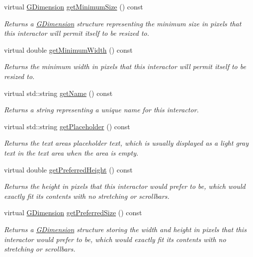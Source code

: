 \begin{DoxyCompactItemize}
virtual \mbox{\hyperlink{classGDimension}{G\+Dimension}} \mbox{\hyperlink{classGInteractor_a66b5af0b32493b4d597ca0a3df2049ea}{get\+Minimum\+Size}} () const
\begin{DoxyCompactList}\small\item\em Returns a \mbox{\hyperlink{classGDimension}{G\+Dimension}} structure representing the minimum size in pixels that this interactor will permit itself to be resized to. \end{DoxyCompactList}\item 
virtual double \mbox{\hyperlink{classGInteractor_a59e668114fe3d49d2a0f28deb258f7c8}{get\+Minimum\+Width}} () const
\begin{DoxyCompactList}\small\item\em Returns the minimum width in pixels that this interactor will permit itself to be resized to. \end{DoxyCompactList}\item 
virtual std\+::string \mbox{\hyperlink{classGInteractor_a8a60438a5b55d0b2ceb35c8674b9d8c5}{get\+Name}} () const
\begin{DoxyCompactList}\small\item\em Returns a string representing a unique name for this interactor. \end{DoxyCompactList}\item 
virtual std\+::string \mbox{\hyperlink{classGTextArea_aa78dbaa7dac1f8cdf9048c91abecc7ad}{get\+Placeholder}} () const
\begin{DoxyCompactList}\small\item\em Returns the text area\textquotesingle{}s placeholder text, which is usually displayed as a light gray text in the text area when the area is empty. \end{DoxyCompactList}\item 
virtual double \mbox{\hyperlink{classGInteractor_a747de0961653847bdc6615dbf756d715}{get\+Preferred\+Height}} () const
\begin{DoxyCompactList}\small\item\em Returns the height in pixels that this interactor would prefer to be, which would exactly fit its contents with no stretching or scrollbars. \end{DoxyCompactList}\item 
virtual \mbox{\hyperlink{classGDimension}{G\+Dimension}} \mbox{\hyperlink{classGInteractor_a4aabbee761d8e9116275401131b7ccd1}{get\+Preferred\+Size}} () const
\begin{DoxyCompactList}\small\item\em Returns a \mbox{\hyperlink{classGDimension}{G\+Dimension}} structure storing the width and height in pixels that this interactor would prefer to be, which would exactly fit its contents with no stretching or scrollbars. \end{DoxyCompactList}\item 

\end{DoxyCompactItemize}
